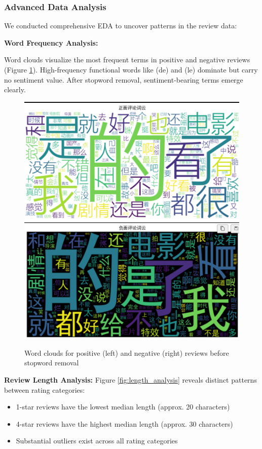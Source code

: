 \documentclass{article}
\begin{document}
\subsubsection{Advanced Data Analysis}
\label{sssec:advanced_analysis}

We conducted comprehensive EDA to uncover patterns in the review data:

\textbf{Word Frequency Analysis:} 

Word clouds visualize the most frequent terms in positive and negative reviews 
(Figure \ref{fig:wordclouds}). High-frequency functional words like (de) and (le) dominate 
but carry no sentiment value. After stopword removal, sentiment-bearing terms emerge clearly.

\begin{figure}[h]
    \centering
    \includegraphics[width=0.45\columnwidth]{pic/T2P2B1.1.png}
    \includegraphics[width=0.45\columnwidth]{pic/T2P2B1.2.png}
    \caption{Word clouds for positive (left) and negative (right) reviews before stopword removal}
    \label{fig:wordclouds}
\end{figure}

\textbf{Review Length Analysis:} 
Figure \ref{fig:length_analysis} reveals distinct patterns between rating categories:
\begin{itemize}
    \item 1-star reviews have the lowest median length (approx. 20 characters)
    \item 4-star reviews have the highest median length (approx. 30 characters)
    \item Substantial outliers exist across all rating categories
\end{itemize}
\end{document}
